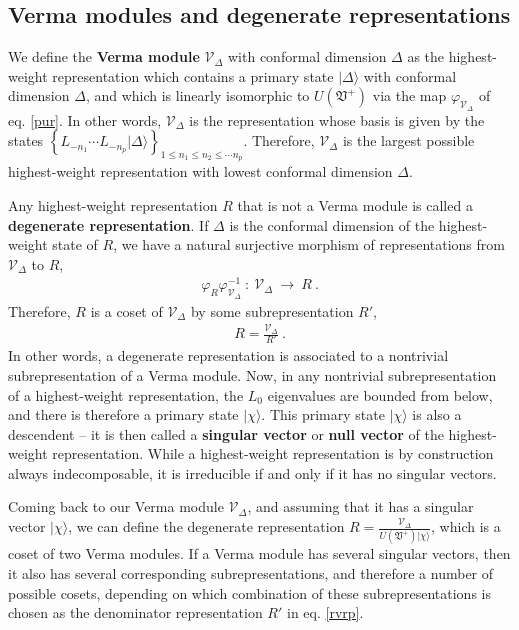 \documentclass[12pt, a4paper, notitlepage, twoside]{report}
\numberwithin{equation}{section}
\theoremstyle{break}
\begin{document}
\subsection{Verma modules and degenerate representations \label{secvm}}

We define the \textbf{\boldmath Verma module} $\mathcal{V}_\Delta$ with conformal dimension $\Delta$ as the highest-weight representation which contains a primary state $|\Delta\rangle$ with conformal dimension $\Delta$, and which is linearly isomorphic to $U(\mathfrak{V}^+)$ via the map $\varphi_{\mathcal{V}_\Delta}$ of eq. \eqref{pur}.
In other words, $\mathcal{V}_\Delta$ is the representation whose basis is given by the states  $\left\{ L_{-n_1} \cdots L_{-n_p}|\Delta\rangle\right\}_{1\leq n_1\leq n_2\leq \cdots n_p}$.
Therefore, $\mathcal{V}_\Delta$ is the largest possible highest-weight representation with lowest conformal dimension $\Delta$. 

Any  highest-weight representation $R$ that is not a Verma module is called a \textbf{\boldmath degenerate representation}.
If $\Delta$ is the conformal dimension of the highest-weight state of $R$, we have a natural surjective morphism of representations from $\mathcal{V}_\Delta$ to $R$,
\begin{align}
\varphi_R \varphi_{\mathcal{V}_\Delta}^{-1}\ : \  \mathcal{V}_\Delta\ \rightarrow\ R \ .
\end{align}
Therefore, $R$ is a coset of $\mathcal{V}_\Delta$ by some subrepresentation $R'$,
\begin{align}
 R = \frac{\mathcal{V}_\Delta}{R'}\ .
\label{rvrp}
\end{align}
In other words, a degenerate representation is associated to a nontrivial subrepresentation of a Verma module.
Now, in any nontrivial subrepresentation of a highest-weight representation, the $L_0$ eigenvalues are bounded from below, and there is therefore a primary state $|\chi\rangle$.
This primary state $|\chi\rangle$ is also a descendent -- it is then called a \textbf{\boldmath singular vector} or \textbf{\boldmath null vector} of the highest-weight representation.
While a highest-weight representation is by construction always indecomposable, it is irreducible if and only if it has no singular vectors.

Coming back to our Verma module $\mathcal{V}_\Delta$, and assuming that it has a singular vector $|\chi\rangle$, we can define the degenerate representation $R = \frac{\mathcal{V}_\Delta}{U(\mathfrak{V}^+)|\chi\rangle}$, which is a coset of two Verma modules.
If a Verma module has several singular vectors, then it also has several corresponding subrepresentations, and therefore a number of possible cosets, depending on which combination of these subrepresentations is chosen as the denominator representation $R'$ in eq. \eqref{rvrp}.
\end{document}
